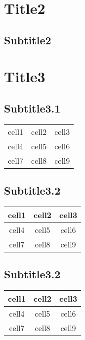 \documentclass{uc3mpracticas}
\begin{document}
  \section{Title2}
    \subsection{Subtitle2}


    \section{Title3}
    \subsection{Subtitle3.1}


      \begin{center}
        \begin{tabular}{ c c c }
         cell1 & cell2 & cell3 \\
         cell4 & cell5 & cell6 \\
         cell7 & cell8 & cell9
        \end{tabular}
      \end{center}

    \subsection{Subtitle3.2}

      \begin{center}
        \begin{tabular}{ | c | c | c | }
          \hline
         cell1 & cell2 & cell3 \\
         \hline
         cell4 & cell5 & cell6 \\
         \hline
         cell7 & cell8 & cell9 \\
         \hline
        \end{tabular}
      \end{center}

    \subsection{Subtitle3.2}

      \begin{center}
        \begin{tabular}{  c | c | c  }

         cell1 & cell2 & cell3 \\
         \hline
         \hline
         cell4 & cell5 & cell6 \\
         cell7 & cell8 & cell9 \\
        \end{tabular}
      \end{center}
\end{document}
